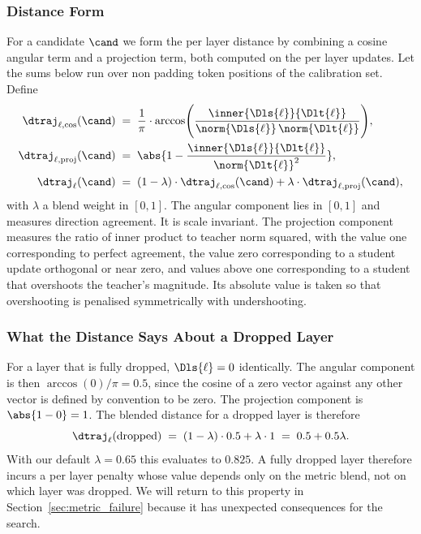 \subsubsection{Distance Form}

For a candidate $\cand$ we form the per layer distance by combining a cosine angular term and a projection term, both computed on the per layer updates. Let the sums below run over non padding token positions of the calibration set. Define
\begin{align}
\dtraj_{\ell, \cos}(\cand) &\;=\; \frac{1}{\pi} \cdot \arccos \!\Bigg( \frac{\inner{\Dls{\ell}}{\Dlt{\ell}}}{\norm{\Dls{\ell}} \, \norm{\Dlt{\ell}}} \Bigg), \\
\dtraj_{\ell, \mathrm{proj}}(\cand) &\;=\; \abs{1 - \frac{\inner{\Dls{\ell}}{\Dlt{\ell}}}{\norm{\Dlt{\ell}}^2}}, \\
\dtraj_\ell(\cand) &\;=\; (1 - \lambda) \cdot \dtraj_{\ell, \cos}(\cand) + \lambda \cdot \dtraj_{\ell, \mathrm{proj}}(\cand),
\label{eq:layer_distance}
\end{align}
with $\lambda$ a blend weight in $[0, 1]$. The angular component lies in $[0, 1]$ and measures direction agreement. It is scale invariant. The projection component measures the ratio of inner product to teacher norm squared, with the value one corresponding to perfect agreement, the value zero corresponding to a student update orthogonal or near zero, and values above one corresponding to a student that overshoots the teacher's magnitude. Its absolute value is taken so that overshooting is penalised symmetrically with undershooting.

\subsubsection{What the Distance Says About a Dropped Layer}

For a layer that is fully dropped, $\Dls{\ell} = 0$ identically. The angular component is then $\arccos(0)/\pi = 0.5$, since the cosine of a zero vector against any other vector is defined by convention to be zero. The projection component is $\abs{1 - 0} = 1$. The blended distance for a dropped layer is therefore
\begin{equation}
\dtraj_\ell(\text{dropped}) \;=\; (1 - \lambda) \cdot 0.5 + \lambda \cdot 1 \;=\; 0.5 + 0.5 \lambda.
\end{equation}
With our default $\lambda = 0.65$ this evaluates to $0.825$. A fully dropped layer therefore incurs a per layer penalty whose value depends only on the metric blend, not on which layer was dropped. We will return to this property in Section~\ref{sec:metric_failure} because it has unexpected consequences for the search.

